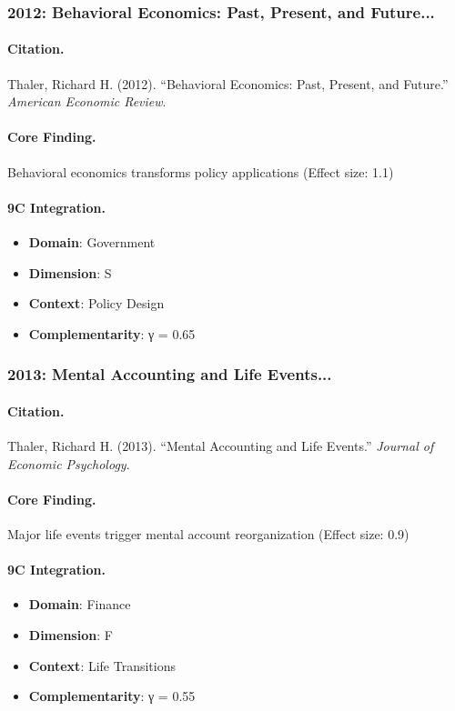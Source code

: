 \subsubsection{2012: Behavioral Economics: Past, Present, and Future...}

\paragraph{Citation.}
Thaler, Richard H. (2012). ``Behavioral Economics: Past, Present, and Future.''
\textit{American Economic Review}.

\paragraph{Core Finding.}
Behavioral economics transforms policy applications (Effect size: 1.1)

\paragraph{9C Integration.}
\begin{itemize}[nosep]
  \item \textbf{Domain}: Government
  \item \textbf{Dimension}: S
  \item \textbf{Context}: Policy Design
  \item \textbf{Complementarity}: γ = 0.65
\end{itemize}

\subsubsection{2013: Mental Accounting and Life Events...}

\paragraph{Citation.}
Thaler, Richard H. (2013). ``Mental Accounting and Life Events.''
\textit{Journal of Economic Psychology}.

\paragraph{Core Finding.}
Major life events trigger mental account reorganization (Effect size: 0.9)

\paragraph{9C Integration.}
\begin{itemize}[nosep]
  \item \textbf{Domain}: Finance
  \item \textbf{Dimension}: F
  \item \textbf{Context}: Life Transitions
  \item \textbf{Complementarity}: γ = 0.55
\end{itemize}

